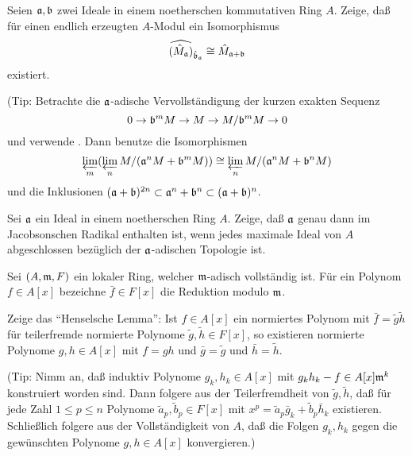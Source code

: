 \begin{exercise}
	Seien \(\mathfrak{a}, \mathfrak{b}\) zwei Ideale in einem noetherschen kommutativen Ring \(A\). Zeige, daß für einen endlich erzeugten
	\(A\)-Modul ein Isomorphismus
	\[
		\widehat{(\hat M_{\mathfrak{a}})}_{\hat{\mathfrak{b}}_{\mathfrak{a}}} \cong \hat M_{\mathfrak{a} + \mathfrak{b}}
	\]
	existiert.
	
	(Tip: Betrachte die \(\mathfrak{a}\)-adische Vervollständigung der kurzen exakten Sequenz
	\[
		0 \to \mathfrak{b}^m M \to M \to M/\mathfrak{b}^m M \to 0
	\]
	und verwende . Dann benutze die Isomorphismen
	\[
		\varprojlim\limits_m (\varprojlim\limits_n M/(\mathfrak{a}^n M + \mathfrak{b}^m M)) \cong
		\varprojlim\limits_n M/(\mathfrak{a}^n M + \mathfrak{b}^n M)
	\]
	und die Inklusionen \((\mathfrak{a} + \mathfrak{b})^{2n} \subset \mathfrak{a}^n + \mathfrak{b}^n
	\subset (\mathfrak{a} + \mathfrak{b})^n\).
\end{exercise}

\begin{exercise}
	Sei \(\mathfrak{a}\) ein Ideal in einem noetherschen Ring \(A\). Zeige, daß \(\mathfrak{a}\) genau dann
	im Jacobsonschen Radikal enthalten ist, wenn jedes maximale Ideal von \(A\) abgeschlossen
	bezüglich der \(\mathfrak{a}\)-adischen Topologie ist.
\end{exercise}

\begin{exercise}
	\label{exer:hensel}
	Sei \((A, \mathfrak{m}, F)\) ein lokaler Ring, welcher \(\mathfrak{m}\)-adisch vollständig ist. Für ein Polynom
	\(f \in A[x]\) bezeichne \(\bar f \in F[x]\) die Reduktion modulo \(\mathfrak{m}\).
	
	Zeige das "`Henselsche Lemma"':
	Ist \(f \in A[x]\) ein normiertes Polynom mit \(\bar f = \tilde g \tilde h\) für teilerfremde normierte Polynome \(\tilde g,
	\tilde h \in F[x]\), so existieren normierte Polynome \(g, h \in A[x]\) mit \(f = g h\) und \(\bar g = \tilde g\) und
	\(\bar h = \tilde h\).
	
	(Tip: Nimm an, daß induktiv Polynome \(g_k, h_k \in A[x]\) mit \(g_k h_k - f \in A[x] \mathfrak{m}^k\) konstruiert worden sind.
	Dann folgere aus der Teilerfremdheit von \(\tilde g, \tilde h\), daß für jede Zahl \(1 \leq p \leq n\) Polynome
	\(\tilde a_p, \tilde b_p \in F[x]\) mit \(x^p = \tilde a_p \bar g_k + \tilde b_p \bar h_k\) existieren.
	Schließlich folgere aus der Vollständigkeit von \(A\), daß die Folgen \(g_k, h_k\) gegen die gewünschten Polynome \(g, h \in A[x]\)
	konvergieren.)
\end{exercise}

